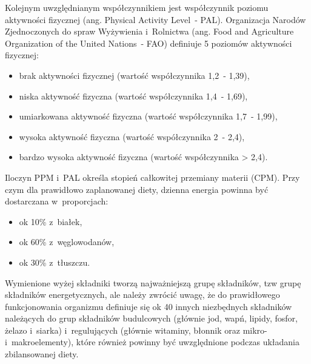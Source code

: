 \par
Kolejnym uwzględnianym współczynnikiem jest współczynnik poziomu aktywności fizycznej (ang. Physical Activity Level~- PAL).
Organizacja Narodów Zjednoczonych do spraw Wyżywienia i~Rolnictwa (ang. Food and Agriculture Organization of the United Nations~- FAO) definiuje 5 poziomów aktywności fizycznej\cite{url:fao-pal}:
\begin{itemize}
    \item brak aktywności fizycznej (wartość współczynnika 1,2~- 1,39),
    \item niska aktywność fizyczna (wartość współczynnika 1,4~- 1,69),
    \item umiarkowana aktywność fizyczna (wartość współczynnika 1,7~- 1,99),
    \item wysoka aktywność fizyczna (wartość współczynnika 2~- 2,4),
    \item bardzo wysoka aktywność fizyczna (wartość współczynnika > 2,4).
\end{itemize}

\par
Iloczyn PPM i~PAL określa stopień całkowitej przemiany materii (CPM)\cite{book:normy-zywienia-czlowieka}.
Przy czym dla prawidłowo zaplanowanej diety, dzienna energia powinna być dostarczana w~proporcjach:
\begin{itemize}
    \item ok 10\% z~białek,
    \item ok 60\% z~węglowodanów,
    \item ok 30\% z~tłuszczu.
\end{itemize}

Wymienione wyżej składniki tworzą najważniejszą grupę składników, tzw grupę składników energetycznych, ale należy zwrócić uwagę,
że do prawidłowego funkcjonowania organizmu definiuje się ok 40 innych niezbędnych składników należących do grup składników budulcowych
(głównie jod, wapń, lipidy, fosfor, żelazo i~siarka) i~regulujących (głównie witaminy, błonnik oraz mikro- i~makroelementy),
które również powinny być uwzględnione podczas układania zbilansowanej diety\cite{book:dietetyka-zywienie-zdrowego-i-chorego-czlowieka}.

